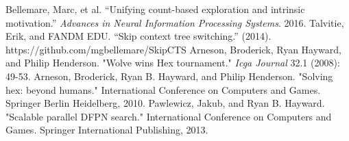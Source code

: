 \documentclass{article}
\begin{document}
\begin{thebibliography}{plain}
Bellemare, Marc, et al. ``Unifying count-based exploration and intrinsic motivation.'' \textit{Advances in Neural Information Processing Systems}. 2016.
Talvitie, Erik, and FANDM EDU. ``Skip context tree switching.'' (2014).
https://github.com/mgbellemare/SkipCTS
Arneson, Broderick, Ryan Hayward, and Philip Henderson. "Wolve wins Hex tournament." \textit{Icga Journal} 32.1 (2008): 49-53.
Arneson, Broderick, Ryan B. Hayward, and Philip Henderson. "Solving hex: beyond humans." International Conference on Computers and Games. Springer Berlin Heidelberg, 2010.
Pawlewicz, Jakub, and Ryan B. Hayward. "Scalable parallel DFPN search." International Conference on Computers and Games. Springer International Publishing, 2013.
\end{thebibliography}
\end{document}
